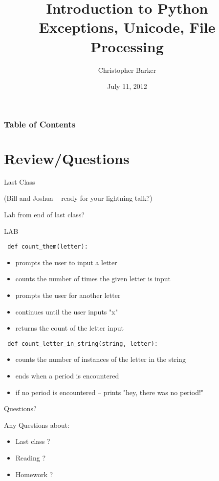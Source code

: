 \documentclass{beamer}
\title[Intro to Python: Week 2]{Introduction  to Python\\ Exceptions, Unicode, File Processing}
\author{Christopher Barker}
\institute{UW Continuing Education / Isilon}
\date{July 11, 2012}
\begin{document}
\begin{frame}
  \titlepage
\end{frame}

\begin{frame}
\frametitle{Table of Contents}
  \tableofcontents
\end{frame}

\section{Review/Questions}


\begin{frame}{Last Class}

\vfill
(Bill and Joshua -- ready for your lightning talk?)

\vfill
{\Large Lab from end of last class?  }

\vfill
\end{frame}


\begin{frame}[fragile]{LAB}

\verb| def count_them(letter): |
\begin{itemize}
  \item prompts the user to input a letter
  \item counts the number of times the given letter is input
  \item prompts the user for another letter
  \item continues until the user inputs "x"
  \item returns the count of the letter input
\end{itemize}

\verb| def count_letter_in_string(string, letter): |
\begin{itemize}
  \item counts the number of instances of the letter in the string
  \item ends when a period is encountered
  \item if no period is encountered -- prints "hey, there was no period!"
\end{itemize}
\end{frame}


\begin{frame}{Questions?}

{\Large Any Questions about:
\begin{itemize}
  \item Last class ?
  \item Reading ?
  \item Homework ?
\end{itemize}
}
\end{frame}
\end{document}
